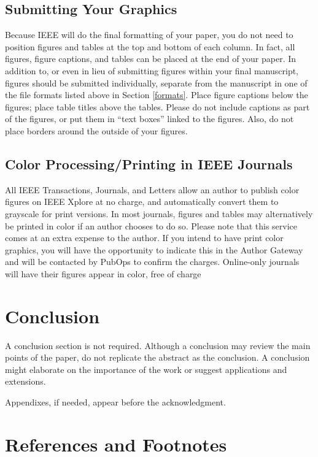 \documentclass[journal,onecolumn,web]{ieeecolor}
\begin{document}
\subsection{Submitting Your Graphics}
Because IEEE will do the final formatting of your paper,
you do not need to position figures and tables at the top and bottom of each 
column. In fact, all figures, figure captions, and tables can be placed at 
the end of your paper. In addition to, or even in lieu of submitting figures 
within your final manuscript, figures should be submitted individually, 
separate from the manuscript in one of the file formats listed above in 
Section \ref{formats}. Place figure captions below the figures; place table titles 
above the tables. Please do not include captions as part of the figures, or 
put them in ``text boxes'' linked to the figures. Also, do not place borders 
around the outside of your figures.

\subsection{Color Processing/Printing in IEEE Journals}
All IEEE Transactions, Journals, and Letters allow an author to publish color figures on IEEE Xplore at no charge, and automatically convert them to grayscale for print versions. In most journals, figures and tables may alternatively be printed in color if an author chooses to do so. Please note that this service comes at an extra expense to the author. If you intend to have print color graphics, you will have the opportunity to indicate this in the Author Gateway and will be contacted by PubOps to confirm the charges. Online-only journals will have their figures appear in color, free of charge 

\section{Conclusion}
A conclusion section is not required. Although a conclusion may review the 
main points of the paper, do not replicate the abstract as the conclusion. A 
conclusion might elaborate on the importance of the work or suggest 
applications and extensions. 

\appendices

Appendixes, if needed, appear before the acknowledgment.

\section*{References and Footnotes}
\end{document}
